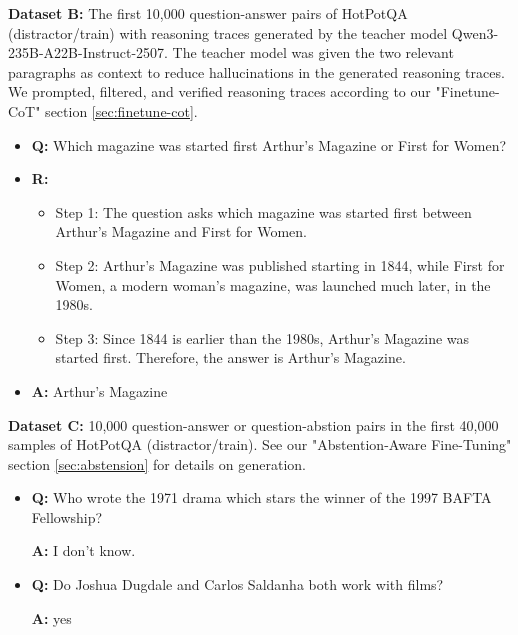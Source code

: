 \documentclass{article}
\begin{document}
\textbf{Dataset B:} The first 10,000 question-answer pairs of HotPotQA (distractor/train) with reasoning traces generated by the teacher model Qwen3-235B-A22B-Instruct-2507. The teacher model was given the two relevant paragraphs as context to reduce hallucinations in the generated reasoning traces. We prompted, filtered, and verified reasoning traces according to our "Finetune-CoT" section \ref{sec:finetune-cot}.
\begin{itemize}
    \item \textbf{Q: } Which magazine was started first Arthur's Magazine or First for Women?
    \item \textbf{R: } 
    \begin{itemize} 
        \item Step 1: The question asks which magazine was started first between Arthur's Magazine and First for Women.
        \item Step 2: Arthur's Magazine was published starting in 1844, while First for Women, a modern woman's magazine, was launched much later, in the 1980s.
        \item Step 3: Since 1844 is earlier than the 1980s, Arthur's Magazine was started first. Therefore, the answer is Arthur's Magazine.
        \end{itemize}
    \item \textbf{A: } Arthur's Magazine


\end{itemize}

\textbf{Dataset C:} 10,000 question-answer or question-abstion pairs in the first 40,000 samples of HotPotQA (distractor/train). See our "Abstention-Aware Fine-Tuning" section \ref{sec:abstension} for details on generation.
\begin{itemize}
    \item \textbf{Q: } Who wrote the 1971 drama which stars the winner of the 1997 BAFTA Fellowship?
    
    \textbf{A: } I don't know.
    
    \item \textbf{Q: } Do Joshua Dugdale and Carlos Saldanha both work with films?
    
    \textbf{A: }yes
\end{itemize}
\end{document}
